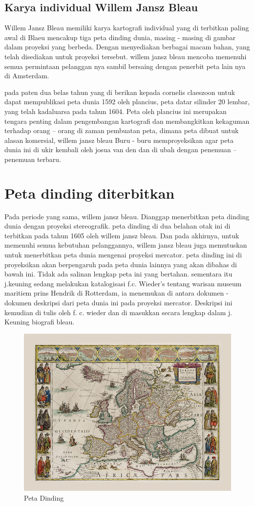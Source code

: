 \subsection{Karya individual Willem Jansz Bleau}
Willem Jansz Bleau memiliki karya kartografi individual yang di terbitkan paling awal di Blaeu mencakup tiga peta dinding dunia, 
masing - masing di gambar dalam proyeksi yang berbeda. Dengan menyediakan berbagai macam bahan, yang telah disediakan untuk proyeksi tersebut. 
willem jansz bleau mencoba memenuhi semua permintaan pelanggan nya sambil bersaing dengan penerbit peta lain nya di Amsterdam. 


pada paten dua belas tahun yang di berikan kepada cornelis claeszoon untuk dapat mempublikasi peta dunia 1592 oleh plancius, peta datar silinder 20 lembar,
yang telah kadaluarsa pada tahun 1604. Peta oleh plancius ini merupakan tengara penting dalam pengembangan kartografi dan membangkitkan kekaguman 
terhadap orang – orang di zaman pembuatan peta, dimana peta dibuat untuk alasan komersial, willem jansz bleau Buru - buru memproyeksikan agar 
peta dunia ini di ukir kembali oleh josua van den dan di ubah dengan penemuan – penemuan terbaru. 


\section{Peta dinding diterbitkan}
Pada periode yang sama, willem jansz bleau. Dianggap menerbitkan peta dinding dunia dengan proyeksi stereografik. 
peta dinding di dua belahan otak ini di terbitkan pada tahun 1605 oleh willem jansz bleau. Dan pada akhirnya, untuk memenuhi semua kebutuhan pelanggannya, willem jansz bleau juga memutuskan untuk menerbitkan peta dunia mengenai proyeksi mercator. 
peta dinding ini di proyeksikan akan berpengaruh pada peta dunia lainnya yang akan dibahas di bawah ini. Tidak ada salinan lengkap peta ini yang bertahan. 
sementara itu j.keuning sedang melakukan katalogisasi f.c. Wieder's tentang
warisan museum maritiem prins Hendrik di Rotterdam, ia menemukan di antara dokumen -
dokumen deskripsi dari peta dunia ini pada proyeksi mercator. Deskripsi ini kemudian di tulis oleh
f. c. wieder dan di masukkan secara lengkap dalam j. Keuning biografi bleau.



\begin{figure}[ht]

\centerline{\includegraphics[width=.5\textwidth]{figures/petadinding.jpg}}

\caption{Peta Dinding}

\label{petadinding}

\end{figure}


